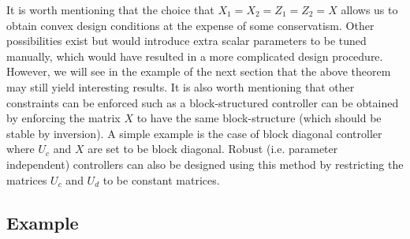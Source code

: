 \documentclass[12pt]{article}
\begin{document}
{It is worth mentioning that the choice that $X_1=X_2=Z_1=Z_2=X$ allows us to obtain convex design conditions at the expense of some conservatism. Other possibilities exist but would introduce extra scalar parameters to be tuned manually, which would have resulted in a more complicated design procedure. However, we will see in the example of the next section that the above theorem may still yield interesting results. It is also worth mentioning that other constraints can be enforced such as a block-structured controller can be obtained by enforcing the matrix $X$ to have the same block-structure (which should be stable by inversion). A simple example is the case of block diagonal controller where $U_c$ and $X$ are set to be block diagonal. Robust (i.e. parameter independent) controllers can also be designed using this method by restricting the matrices $U_c$ and $U_d$ to be constant matrices.}


\subsection{Example}
\end{document}
